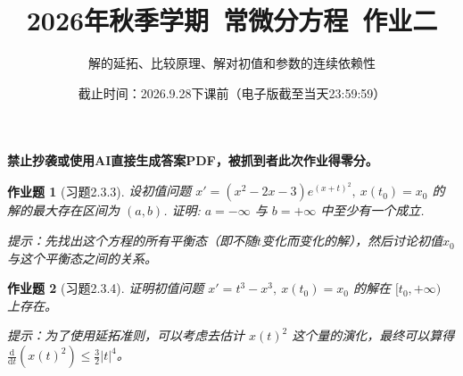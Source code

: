 \documentclass[UTF8,fontset=windows,12pt]{ctexart}
\theoremstyle{kaiti-theorem}
\newtheorem{problem}{作业题}
\numberwithin{equation}{section}
\newcommand{\R}{\mathbb{R}}
\newcommand{\bds}[1]{\boldsymbol{#1}}  %
\newcommand{\ddt}{\frac{\mathrm{d}}{\mathrm{d}t}}
\newcommand{\xx}{{\bds{x}}}
\newcommand{\ff}{\bds{f}}
\begin{document}
\title{\LARGE{\bf  2026年秋季学期~常微分方程~作业二}}
\author{解的延拓、比较原理、解对初值和参数的连续依赖性}
\date{截止时间：2026.9.28下课前（电子版截至当天23:59:59）}

\maketitle

\textbf{禁止抄袭或使用AI直接生成答案PDF，被抓到者此次作业得零分。}


\begin{problem}[习题2.3.3]
设初值问题 $x'=(x^2-2x-3)e^{(x+t)^2},~ x(t_0)=x_0$ 的解的最大存在区间为 $(a,b)$. 证明: $a=-\infty$ 与 $b=+\infty$ 中至少有一个成立.

提示：先找出这个方程的所有平衡态（即不随$t$变化而变化的解），然后讨论初值$x_0$与这个平衡态之间的关系。
\end{problem}

\begin{problem}[习题2.3.4] 
证明初值问题 $x'=t^3-x^3,~ x(t_0)=x_0$ 的解在 $[t_0,+\infty)$ 上存在。

提示：为了使用延拓准则，可以考虑去估计 $x(t)^2$ 这个量的演化，最终可以算得 $\ddt(x(t)^2)\leqslant \frac32 |t|^4$。
\end{problem}

%
\end{document}
